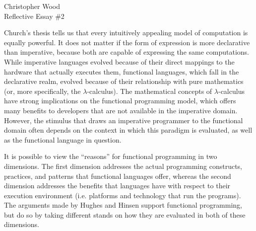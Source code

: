 \documentclass[12pt,letterpaper]{article}
\begin{document}
\begin{center}
Christopher Wood \\
Reflective Essay \#2 \\
\end{center}


Church's thesis tells us that every intuitively appealing model of computation is equally powerful. It does not 
matter if the form of expression is more declarative than imperative, because both are capable of 
expressing the same computations. While imperative languages evolved because of their direct mappings
to the hardware that actually executes them, functional languages, which fall in the declarative realm, evolved
because of their relationship with pure mathematics (or, more specifically, the $\lambda$-calculus). The mathematical
concepts of $\lambda$-calculus have strong implications on the functional programming model, which offers
many benefits to developers that are not available in the imperative domain. However, the stimulus that draws 
an imperative programmer to the functional domain often depends on the context in which this paradigm is
evaluated, as well as the functional language in question.

It is possible to view the ``reasons'' for functional programming in two dimensions. The first dimension addresses 
the actual programming constructs, practices, and patterns that functional languages offer, whereas the second dimension addresses the benefits that languages have with respect to their execution environment (i.e. platforms and technology that
run the programs). The arguments made by Hughes \cite{Hughes} and Hinsen \cite{Hinsen} support functional
programming, but do so by taking different stands on how they are evaluated in both of these dimensions.
\end{document}
